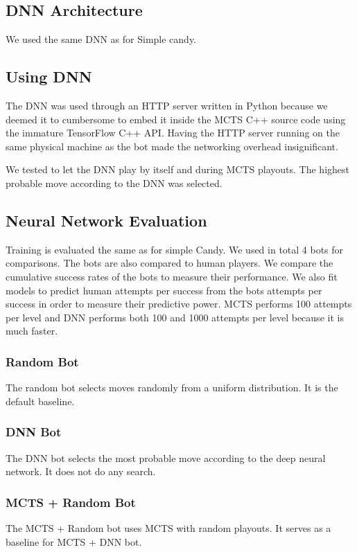 \documentclass{kththesis}
\begin{document}
\subsection{DNN Architecture}
We used the same DNN as for Simple candy.

\subsection{Using DNN}
The DNN was used through an HTTP server written in Python because we deemed it to cumbersome to embed it inside the MCTS C++ source code using the immature TensorFlow C++ API. Having the HTTP server running on the same physical machine as the bot made the networking overhead  insignificant.

We tested  to let the DNN play by itself and during MCTS playouts. The highest probable move according to the DNN was selected.

\subsection{Neural Network Evaluation}
Training is evaluated the same as for simple Candy. We used in total 4 bots for comparisons. The bots are also compared to human players. We compare the cumulative success rates of the bots to measure their performance. We also fit models to predict human attempts per success from the bots attempts per success in order to measure their predictive power. MCTS performs 100 attempts per level and DNN performs both 100 and 1000 attempts per level because it is much faster. 

\subsubsection{Random Bot}
The random bot selects moves randomly from a uniform distribution. It is the default baseline. 

\subsubsection{DNN Bot}
The DNN bot selects the most probable move according to the deep neural network. It does not do any search. 

\subsubsection{MCTS + Random Bot}
The MCTS + Random  bot uses MCTS with random playouts. It serves as a baseline for MCTS + DNN bot.
\end{document}
